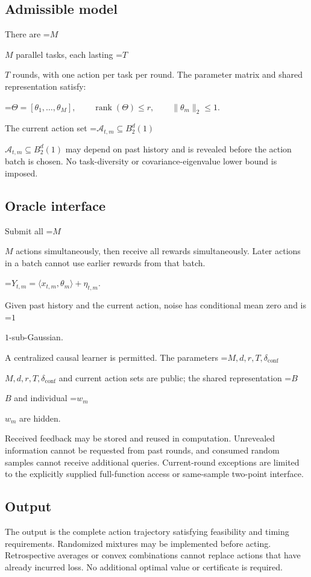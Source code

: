 \documentclass[10pt,a4paper]{article}
\newcommand{\AtlasMath}[1]{\par\begingroup\centering\setbox0=\hbox{$\displaystyle #1$}\ifdim\wd0>1.4\linewidth\typeout{ATLAS WIDE FORMULA: \the\wd0}\fi\ifdim\wd0>\linewidth\resizebox{\linewidth}{!}{\box0}\else\box0\fi\par\endgroup}
\newcommand{\AtlasInlineMath}[1]{\begingroup\setbox0=\hbox{$#1$}\ifdim\wd0>.4\linewidth\endgroup\AtlasMath{#1}\else\endgroup$#1$\fi}
\begin{document}
\subsection{Admissible model}
There are \AtlasInlineMath{M} parallel tasks, each lasting \AtlasInlineMath{T} rounds, with one action per task per round. The parameter matrix and shared representation satisfy:


\AtlasMath{\Theta=[\theta_1,\ldots,\theta_M],\qquad \operatorname{rank}(\Theta)\le r,\qquad \|\theta_m\|_2\le1.}


The current action set \AtlasInlineMath{\mathcal{A}_{t,m}\subseteq B_2^d(1)} may depend on past history and is revealed before the action batch is chosen. No task-diversity or covariance-eigenvalue lower bound is imposed.

\subsection{Oracle interface}
Submit all \AtlasInlineMath{M} actions simultaneously, then receive all rewards simultaneously. Later actions in a batch cannot use earlier rewards from that batch.


\AtlasMath{Y_{t,m}=\langle x_{t,m},\theta_m\rangle+\eta_{t,m}.}


Given past history and the current action, noise has conditional mean zero and is \AtlasInlineMath{1}-sub-Gaussian.

A centralized causal learner is permitted. The parameters \AtlasInlineMath{M,d,r,T,\delta_{\mathrm{conf}}} and current action sets are public; the shared representation \AtlasInlineMath{B} and individual \AtlasInlineMath{w_m} are hidden.

Received feedback may be stored and reused in computation. Unrevealed information cannot be requested from past rounds, and consumed random samples cannot receive additional queries. Current-round exceptions are limited to the explicitly supplied full-function access or same-sample two-point interface.

\subsection{Output}
The output is the complete action trajectory satisfying feasibility and timing requirements. Randomized mixtures may be implemented before acting. Retrospective averages or convex combinations cannot replace actions that have already incurred loss. No additional optimal value or certificate is required.
\end{document}
